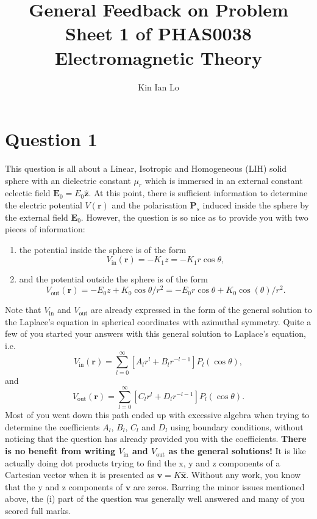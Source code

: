 \documentclass[a4paper]{article}
\title{General Feedback on Problem Sheet 1 of PHAS0038 Electromagnetic Theory}
\author{Kin Ian Lo}
\begin{document}
\maketitle
\section{Question 1}
\label{sec:question_1}
This question is all about a Linear, Isotropic and Homogeneous (LIH) solid sphere with an dielectric constant $\mu_r$ which is immersed in an external constant eclectic field $\mathbf{E}_0 = E_0 \mathbf{\hat{z}}$. 
At this point, there is sufficient information to determine the electric potential $V(\mathbf{r})$ and the polarisation $\mathbf{P}_s$ induced inside the sphere by the external field $\mathbf{E}_0$.
However, the question is so nice as to provide you with two pieces of information:
\begin{enumerate}
    \item the potential inside the sphere is of the form 
        \[
            V_\text{in}(\mathbf{r}) = - K_1 z = - K_1 r \cos\theta
        ,\] 
    \item and the potential outside the sphere is of the form 
        \[
            V_\text{out}(\mathbf{r}) = - E_0 z + K_0 \cos\theta/r^2 = -E_0 r \cos\theta + K_0 \cos(\theta)/r^2
        .\] 
\end{enumerate}
Note that $V_\text{in}$ and $V_\text{out}$ are already expressed in the form of the general solution to the Laplace's equation in spherical coordinates with azimuthal symmetry. Quite a few of you started your answers with this general solution to Laplace's equation, i.e.
\[
    V_\text{in}(\mathbf{r}) = \sum_{l=0}^\infty \left[ A_l r^l + B_l r^{-l-1} \right] P_l(\cos\theta)
,\] and
\[
    V_\text{out}(\mathbf{r}) = \sum_{l=0}^\infty \left[ C_l r^l + D_l r^{-l-1} \right] P_l(\cos\theta)
.\] 
Most of you went down this path ended up with excessive algebra when trying to determine the coefficients $A_l$, $B_l$, $C_l$ and $D_l$ using boundary conditions, without noticing that the question has already provided you with the coefficients.
\textbf{There is no benefit from writing $V_\text{in}$ and $V_\text{out}$ as the general solutions!}
It is like actually doing dot products trying to find the x, y and z components of a Cartesian vector when it is presented as  $\mathbf{v} = K \mathbf{\hat{x}}$.
Without any work, you know that the y and z components of $\mathbf{v}$ are zeros. 
Barring the minor issues mentioned above, the (i) part of the question was generally well answered and many of you scored full marks.
\end{document}
